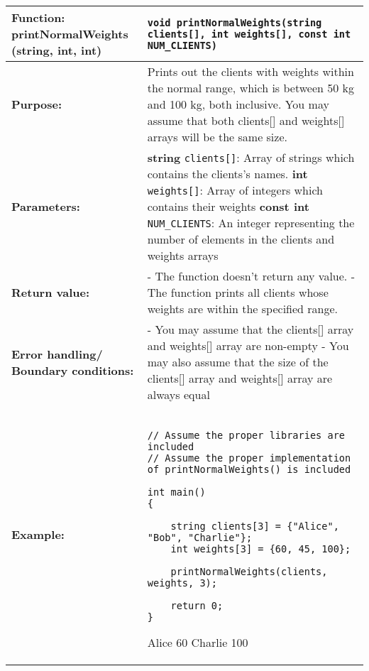 \begin{longtable}[H]{|p{1.7in}|p{4.0in}|} \hline
        \textbf{Function:} \newline 
        printNormalWeights (string, int, int) & \texttt{void printNormalWeights(string clients[], int weights[], const int NUM_CLIENTS)}
        \\ \hline
        \textbf{Purpose:}  & Prints out the clients with weights within the normal range, which is between 50 kg and 100 kg, both inclusive. You may assume that both clients[] and weights[] arrays will be the same size. \\ \hline
        \textbf{Parameters:} &  
        \textbf{string} \texttt{clients[]}: Array of strings which contains the clients's names. \newline
        \textbf{int} \texttt{weights[]}: Array of integers which contains their weights \newline
        \textbf{const int} \texttt{NUM\_CLIENTS}: An integer representing the number of elements in the clients and weights arrays
\\ \hline
        \textbf{Return value:} &  
        - The function doesn't return any value.\newline 
        - The function prints all clients whose weights are within the specified range.\\ \hline
         \textbf{Error handling/ Boundary conditions:} &  
         - You may assume that the clients[] array and weights[] array are non-empty\newline 
        - You may also assume that the size of the clients[] array and weights[] array are always equal\\ \hline
        \textbf{Example:} & 
        \begin{example}
        \begin{verbatim}

// Assume the proper libraries are included
// Assume the proper implementation of printNormalWeights() is included

int main() 
{
    
    string clients[3] = {"Alice", "Bob", "Charlie"};
    int weights[3] = {60, 45, 100};
    
    printNormalWeights(clients, weights, 3);
        
    return 0;
}
        \end{verbatim}
        \end{example}

        \begin{sample}

Alice 60 \newline
Charlie 100 \newline
        \end{sample}
             \\ \hline
\end{longtable}

